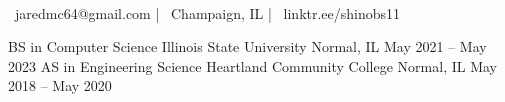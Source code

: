 \documentclass[]{awesome-cv}
\begin{document}

\begin{center}
	  \\ 
	\vspace{2mm}
	{\faEnvelope\ jaredmc64@gmail.com} | {\faMapMarker\ Champaign, IL} | {\faLink\ linktr.ee/shinobs11}
\end{center}
\begin{cventries}
	\cventry
	{BS in Computer Science}
	{Illinois State University}
	{Normal, IL}
	{May 2021 – May 2023}
  {}
	\cventry
	{AS in Engineering Science}
	{Heartland Community College}
	{Normal, IL}
	{May 2018 – May 2020}
	{}
\end{cventries}
\end{document}
